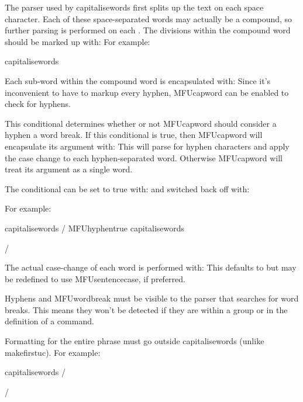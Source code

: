 \documentclass[titlepage=false,oneside,
 fontsize=12pt,captions=tableheading]{scrbook}
\begin{document}
The parser used by \gls{capitalisewords} first splits up the text on
each space character. Each of these space-separated words may
actually be a compound, so further parsing is performed on each
. The divisions within the compound word should be marked
up with:
For example:
\begin{coderesult}
\gls{capitalisewords}
\tcblower
{}
\end{coderesult}
Each sub-word within the compound word is encapsulated with:
Since it's inconvenient to have to markup every hyphen,
\gls{MFUcapword} can be enabled to check for hyphens.
 
This conditional determines whether or not \gls{MFUcapword} should
consider a hyphen a word break. If this conditional is true, then
\gls{MFUcapword} will encapsulate its argument with:
This will parse  for hyphen characters and apply the case
change to each hyphen-separated word.  Otherwise \gls{MFUcapword}
will treat its argument as a single word.

The conditional can be set to true with:
and switched back off with:

For example:
\begin{codebox}
\gls{capitalisewords} /
\gls{MFUhyphentrue}
\gls{capitalisewords}
\end{codebox}
\begin{resultbox}
 /
\MFUhyphentrue
{}
\end{resultbox}

The actual case-change of each word is performed with:
This defaults to  but may be
redefined to use \gls{MFUsentencecase}, if preferred.

\begin{important}
Hyphens and \gls{MFUwordbreak} must be visible to the parser that
searches for word breaks. This means they won't be detected if they
are within a group or in the definition of a command.
\end{important}

Formatting for the entire phrase must go outside
\gls{capitalisewords} (unlike \gls{makefirstuc}).
For example:
\begin{codebox}
\gls{capitalisewords} /
\end{codebox}
\begin{resultbox}
 /
\emph{}
\end{resultbox}
\end{document}
